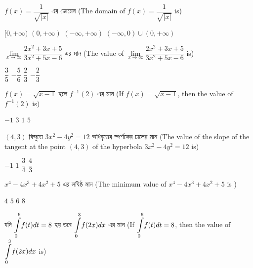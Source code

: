 \documentclass[addpoints]{exam}
\begin{document}
\begin{questions}
\question   $ f(x) = \dfrac{1}{\sqrt{|x|}} $ এর ডোমেন (The domain of  $ f(x) = \dfrac{1}{\sqrt{|x|}} $ is)

\begin{oneparchoices}
\choice $ [0,+\infty) $
\choice $ (0,+\infty) $
\choice $ (-\infty, +\infty) $
\choice $ (-\infty, 0)\cup (0, +\infty)  $

\end{oneparchoices}

\question   $ \lim\limits_{x\to \infty} \dfrac{2x^2 +3x+5}{3x^2 +5x-6} $ এর মান (The value of $ \lim\limits_{x\to \infty} \dfrac{2x^2 +3x+5}{3x^2 +5x-6} $ is)

\begin{oneparchoices}
\choice $ \dfrac{3}{5} $
\choice $ -\dfrac{5}{6} $
\choice $ \dfrac{2}{3} $
\choice $ -\dfrac{2}{3}  $

\end{oneparchoices}

\question   $ f(x) = \sqrt{x-1} $ হলে $ f^{-1}(2) $ এর মান (If $ f(x) = \sqrt{x-1} $, then the value of $ f^{-1}(2) $ is)

\begin{oneparchoices}
\choice $ -1 $
\choice $ 3 $
\choice $ 1 $
\choice $ 5  $

\end{oneparchoices}

\question    $ (4,3) $ বিন্দুতে $ 3x^2 -4y^2 =12 $ অধিবৃত্তের স্পর্শকের ঢালের মান (The value of the slope of the tangent at the point $ (4,3) $ of the hyperbola $ 3x^2 -4y^2 =12 $ is)

\begin{oneparchoices}
\choice $ -1 $
\choice $ 1 $
\choice $ \dfrac{3}{4} $
\choice $ \dfrac{4}{3} $

\end{oneparchoices}

\question  $ x^{4}-4x^{3}+4x^{2} + 5  $  এর লঘিষ্ঠ মান (The minimum value of $ x^{4}-4x^{3}+4x^{2} + 5  $ is )

\begin{oneparchoices}
\choice $ 4 $
\choice $ 5 $
\choice $ 6 $
\choice $ 8 $

\end{oneparchoices}

\question  যদি $ \mathlarger{\int\limits_{0}^{6}}f(t)dt =8 $ হয় তবে $ \mathlarger{\int\limits_{0}^{3}}f(2x)dx $ এর মান (If $ \mathlarger{\int\limits_{0}^{6}}f(t)dt =8 $, then the value of $ \mathlarger{\int\limits_{0}^{3}}f(2x)dx $ is)


\end{questions}
\end{document}

